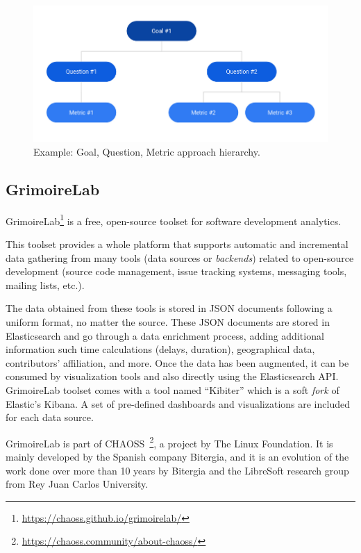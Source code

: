 \documentclass[a4paper, 12pt]{book}
\begin{document}
\begin{figure}
 \centering
  \includegraphics[width=12cm, keepaspectratio]{img/example-gqm-schema}
  \caption{Example: Goal, Question, Metric approach hierarchy.}
  \label{fig:example-gqm-schema}
\end{figure}

\subsection{GrimoireLab}
\label{ssec:GrimoireLab}
GrimoireLab\footnote{\url{https://chaoss.github.io/grimoirelab/}} is a free, open-source toolset for software development analytics.

This toolset provides a whole platform that supports automatic and incremental data gathering from many tools (data sources or \emph{backends}) related to open-source development (source code management, issue tracking systems, messaging tools, mailing lists, etc.).

The data obtained from these tools is stored in JSON documents following a uniform format, no matter the source. These JSON documents are stored in Elasticsearch and go through a data enrichment process, adding additional information such time calculations (delays, duration), geographical data, contributors' affiliation, and more.
Once the data has been augmented, it can be consumed by visualization tools and also directly using the Elasticsearch API. GrimoireLab toolset comes with a tool named ``Kibiter'' which is a soft \emph{fork} of Elastic's Kibana. A set of pre-defined dashboards and visualizations are included for each data source.  

GrimoireLab is part of CHAOSS~\footnote{\url{https://chaoss.community/about-chaoss/}}, a project by The Linux Foundation. It is mainly developed by the Spanish company Bitergia, and it is an evolution of the work done over more than 10 years by Bitergia and the LibreSoft research group from Rey Juan Carlos University.
\end{document}
